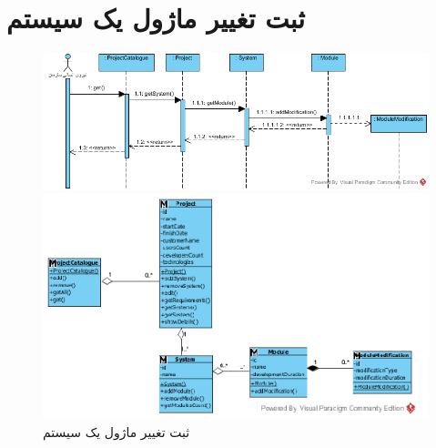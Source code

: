 \section{ثبت تغییر ماژول یک سیستم}
\begin{figure}[H]
	\centering
	\includegraphics[scale=0.6]{img/sequence-analysis/AddModuleModification}
	
	
	\includegraphics[scale=0.7]{img/sequence-analysis/AddModuleModificationC}
	\caption{ثبت تغییر ماژول یک سیستم}
\end{figure}


